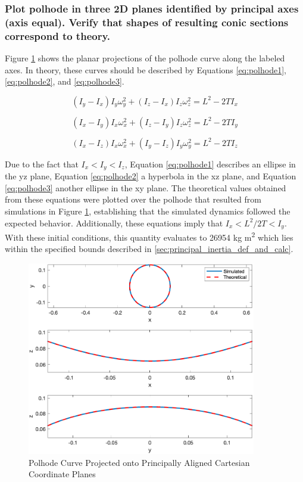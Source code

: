 \subsubsection{Plot polhode in three 2D planes identified by principal axes (axis equal). Verify that shapes of resulting conic sections correspond to theory.}

Figure \ref{fig:2d_polhode} shows the planar projections of the polhode curve along the labeled axes. In theory, these curves should be described by Equations \ref{eq:polhode1}, \ref{eq:polhode2}, and \ref{eq:polhode3}. 

\begin{equation} \label{eq:polhode1}
    (I_y - I_x)I_y \omega_y^2 + (I_z - I_x)I_z \omega_z^2 = L^2 - 2TI_x
\end{equation}

\begin{equation} \label{eq:polhode2}
    (I_x - I_y)I_x \omega_x^2 + (I_z - I_y)I_z \omega_z^2 = L^2 - 2TI_y
\end{equation}

\begin{equation} \label{eq:polhode3}
    (I_x - I_z)I_x \omega_x^2 + (I_y - I_z)I_y \omega_y^2 = L^2 - 2TI_z
\end{equation}

Due to the fact that $I_x < I_y < I_z$, Equation \ref{eq:polhode1} describes an ellipse in the yz plane, Equation \ref{eq:polhode2} a hyperbola in the xz plane, and Equation \ref{eq:polhode3} another ellipse in the xy plane. The theoretical values obtained from these equations were plotted over the polhode that resulted from simulations in Figure \ref{fig:2d_polhode}, establishing that the simulated dynamics followed the expected behavior. Additionally, these equations imply that $I_x < L^2/2T < I_y$. With these initial conditions, this quantity evaluates to 26954 kg m\textsuperscript{2} which lies within the specified bounds described in \ref{sec:principal_inertia_def_and_calc}.

\begin{figure}[H]
    \centering
    \includegraphics[width = 10cm]{Images/planar_polhode_random.png}
    \caption{Polhode Curve Projected onto Principally Aligned Cartesian Coordinate Planes}
    \label{fig:2d_polhode}
\end{figure}

